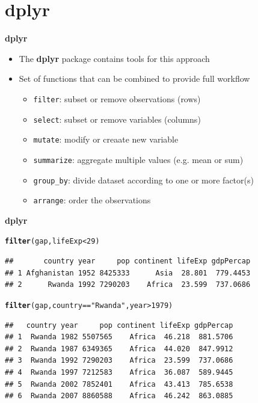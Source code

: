 \documentclass[aspectratio=169]{beamer}\usepackage[]{graphicx}\usepackage[]{color}
\makeatletter
\newcommand{\hlnum}[1]{\textcolor[rgb]{0.686,0.059,0.569}{#1}}%
\newcommand{\hlstr}[1]{\textcolor[rgb]{0.192,0.494,0.8}{#1}}%
\newcommand{\hlopt}[1]{\textcolor[rgb]{0,0,0}{#1}}%
\newcommand{\hlstd}[1]{\textcolor[rgb]{0.345,0.345,0.345}{#1}}%
\newcommand{\hlkwd}[1]{\textcolor[rgb]{0.737,0.353,0.396}{\textbf{#1}}}%
\newenvironment{kframe}{%
 \def\at@end@of@kframe{}%
 \ifinner\ifhmode%
  \def\at@end@of@kframe{\end{minipage}}%
  \begin{minipage}{\columnwidth}%
 \fi\fi%
 \def\FrameCommand##1{\hskip\@totalleftmargin \hskip-\fboxsep
 \colorbox{shadecolor}{##1}\hskip-\fboxsep
     \hskip-\linewidth \hskip-\@totalleftmargin \hskip\columnwidth}%
 \MakeFramed {\advance\hsize-\width
   \@totalleftmargin\z@ \linewidth\hsize
   \@setminipage}}%
 {\par\unskip\endMakeFramed%
 \at@end@of@kframe}
\newenvironment{knitrout}{}{} %
\makeatother
\begin{document}
\section{\textbf{dplyr}}
\begin{frame}{\textbf{dplyr}}
\begin{itemize}
	\item The \textbf{dplyr} package contains tools for this approach
	\item Set of functions that can be combined to provide full workflow
  \begin{itemize}
  	\item \texttt{filter}: subset or remove observations (rows)
  	\item \texttt{select}: subset or remove variables (columns)
  	\item \texttt{mutate}: modify or creaate new variable
  	\item \texttt{summarize}: aggregate multiple values (e.g. mean or sum)
  	\item \texttt{group\_by}: divide dataset according to one or more factor(s)
  	\item \texttt{arrange}: order the observations
  \end{itemize}
\end{itemize}
\end{frame}

\begin{frame}[fragile]{\textbf{dplyr}}

\begin{knitrout}\scriptsize
{}\color{fgcolor}\begin{kframe}
\begin{alltt}
\hlkwd{filter}\hlstd{(gap, lifeExp} \hlopt{<} \hlnum{29}\hlstd{)}
\end{alltt}
\begin{verbatim}
##       country year     pop continent lifeExp gdpPercap
## 1 Afghanistan 1952 8425333      Asia  28.801  779.4453
## 2      Rwanda 1992 7290203    Africa  23.599  737.0686
\end{verbatim}
\begin{alltt}
\hlkwd{filter}\hlstd{(gap, country} \hlopt{==} \hlstr{"Rwanda"}\hlstd{, year} \hlopt{>} \hlnum{1979}\hlstd{)}
\end{alltt}
\begin{verbatim}
##   country year     pop continent lifeExp gdpPercap
## 1  Rwanda 1982 5507565    Africa  46.218  881.5706
## 2  Rwanda 1987 6349365    Africa  44.020  847.9912
## 3  Rwanda 1992 7290203    Africa  23.599  737.0686
## 4  Rwanda 1997 7212583    Africa  36.087  589.9445
## 5  Rwanda 2002 7852401    Africa  43.413  785.6538
## 6  Rwanda 2007 8860588    Africa  46.242  863.0885
\end{verbatim}
\end{kframe}
\end{knitrout}
\end{frame}
\end{document}
